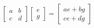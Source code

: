 \documentclass[preview]{standalone}
\begin{document}
\begin{align*}
\begin{bmatrix} a & b \\ c & d \end{bmatrix}\begin{bmatrix} e \\ g \end{bmatrix} = \begin{bmatrix} ae + bg \\ ce + dg \end{bmatrix}
\end{align*}
\end{document}
